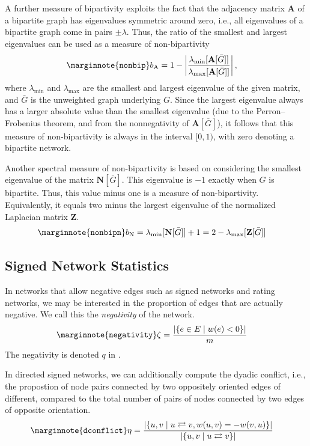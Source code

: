 \documentclass{article}
\begin{document}
A further measure of bipartivity exploits the fact that the adjacency
matrix $\mathbf A$ of a bipartite graph has eigenvalues symmetric around
zero, i.e., all eigenvalues of a bipartite graph come in pairs $\pm
\lambda$. Thus, the ratio of the smallest and largest eigenvalues can be
used as a measure of non-bipartivity
\begin{align}
  \marginnote{\texttt{nonbip}} b_{\mathrm A} &= 1 - \left| \frac
             {\lambda_{\min}[\mathbf A[\bar G]]} {\lambda_{\max}[\mathbf
                 A[\bar G]]} \right|,
\end{align}
where $\lambda_{\min}$ and $\lambda_{\max}$ are the smallest and largest
eigenvalue of the given matrix, and $\bar G$ is the unweighted graph
underlying $G$.  Since the largest eigenvalue always has a larger
absolute value than the smallest eigenvalue (due to the
Perron--Frobenius theorem, and from the nonnegativity of $\mathbf A[\bar
  G]$), it follows that this measure of non-bipartivity is always in the
interval $[0,1)$, with zero denoting a bipartite network.

Another spectral measure of non-bipartivity is based on considering the
smallest eigenvalue of the matrix $\mathbf N[\bar G]$.  This eigenvalue
is $-1$ exactly when $G$ is bipartite.  Thus, this value minus one is a
measure of non-bipartivity. Equivalently, it equals two minus the
largest eigenvalue of the normalized Laplacian matrix $\mathbf Z$.
\begin{align}
  \marginnote{\texttt{nonbipn}} b_{\mathrm N} &= \lambda_{\min}[\mathbf
    N[\bar G]] + 1 = 2 - \lambda_{\max}[\mathbf Z[\bar G]]
\end{align}

\subsection{Signed Network Statistics}
In networks that allow negative edges such as signed networks and rating
networks, we may be interested in the proportion of edges that are
actually negative.  We call this the \emph{negativity} of the network. 
\begin{align}
  \marginnote{\texttt{negativity}}
  \zeta &= \frac { | \{ e \in E \mid w(e) < 0 \} | } {m}
\end{align}
The negativity is denoted $q$ in \cite{b868}. 

In directed signed networks, we can additionally compute the dyadic
conflict, i.e., the propostion of node pairs connected by two oppositely
oriented edges of different, compared to the total number of pairs of
nodes connected by two edges of opposite orientation. 
\begin{align}
  \marginnote{\texttt{dconflict}}
  \eta &= \frac 
       {|\{ u,v \mid u \rightleftarrows v, w(u,v) = - w(v,u) \}|} 
       {|\{ u, v \mid u \rightleftarrows v \}|}
\end{align}
\end{document}
